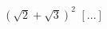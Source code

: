 \begin{esercizio}[\Ast]
\begin{multicols}{2}
\begin{enumeratea}
 \item $(\sqrt 2+\sqrt 3)^2$
  \hfill $\left[...\right]$
 \end{enumeratea}
 \end{multicols}
\end{esercizio}


